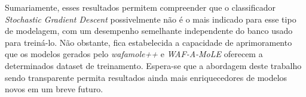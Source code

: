Sumariamente, esses resultados permitem compreender que o classificador \textit{Stochastic Gradient Descent} possivelmente não é o mais indicado para esse tipo de modelagem, com um desempenho semelhante independente do banco usado para treiná-lo. Não obstante, fica estabelecida a capacidade de aprimoramento que os modelos gerados pelo \textit{wafamole++} e \textit{WAF-A-MoLE} oferecem a determinados dataset de treinamento. Espera-se que a abordagem deste trabalho sendo transparente permita resultados ainda mais enriquecedores de modelos novos em um breve futuro.

